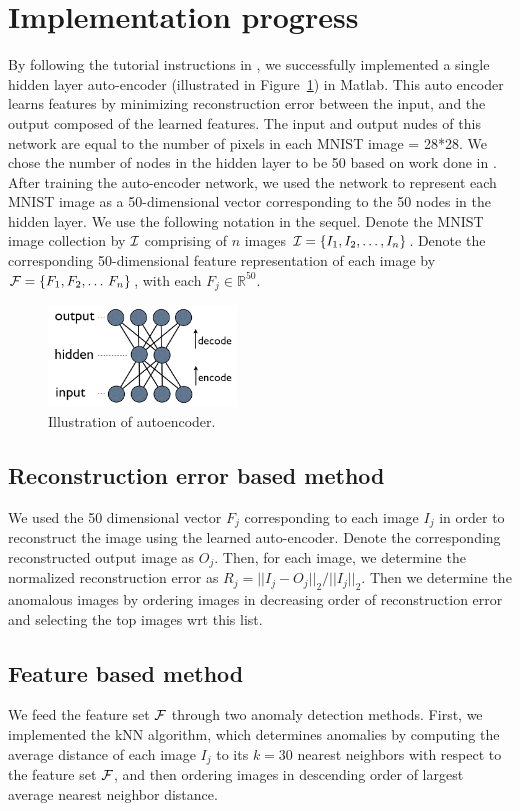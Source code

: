 \documentclass[10pt,twocolumn,letterpaper]{article}
\begin{document}
\section{Implementation progress}
By following the tutorial instructions in \cite{ufldl}, we successfully implemented a single hidden layer auto-encoder (illustrated in Figure~\ref{autoencoder}) in Matlab. This auto encoder learns features by minimizing reconstruction error between the input, and the output composed of the learned features. The input and output nudes of this network are equal to the number of pixels in each MNIST image = 28*28. We chose the number of nodes in the hidden layer to be 50 based on work done in \cite{h2o}. After training the auto-encoder network, we used the network to represent each MNIST image as a 50-dimensional vector corresponding to the 50 nodes in the hidden layer. We use the following notation in the sequel. Denote the MNIST image collection by ${\cal{I}}$ comprising of $n$ images ${\cal{I}} = \{I_1, I_2, \dots, I_n\}$. Denote the corresponding 50-dimensional feature representation of each image by ${\cal{F}} = \{F_1, F_2, \dots\, F_n\}$, with each $F_j \in \mathbb{R}^{50}$.

\begin{figure}[ht!]
\centering
\includegraphics[width=50mm]{figs/autoencoder.png}
\caption{Illustration of autoencoder.}
\label{autoencoder}
\end{figure}

\subsection{Reconstruction error based method} We used the 50 dimensional vector $F_j$ corresponding  to each image $I_j$ in order to reconstruct the image using the learned auto-encoder. Denote the corresponding reconstructed output image as $O_j$. Then, for each image, we determine the normalized reconstruction error as $R_j = ||I_j - O_j||_2/||I_j||_2$. Then we determine the anomalous images by ordering images in decreasing order of reconstruction error and selecting the top images wrt this list.

\subsection{Feature based method}  We feed the feature set $ {\cal{F}} $ through two anomaly detection methods. First, we implemented the kNN algorithm, which determines anomalies by computing the average distance of each image $I_j$ to its $k=30$ nearest neighbors with respect to the feature set ${\cal{F}}$, and then ordering images in descending order of largest average nearest neighbor distance. 
\end{document}
